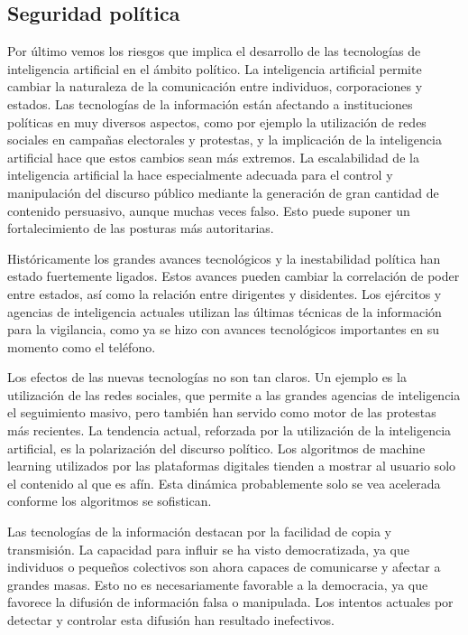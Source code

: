 \documentclass[12pt,a4paper]{article}
\begin{document}
\subsection{Seguridad política}

Por último vemos los riesgos que implica el desarrollo de las tecnologías de inteligencia artificial en el ámbito político. La inteligencia artificial permite cambiar la naturaleza de la comunicación entre individuos, corporaciones y estados. Las tecnologías de la información están afectando a instituciones políticas en muy diversos aspectos, como por ejemplo la utilización de redes sociales en campañas electorales y protestas, y la implicación de la inteligencia artificial hace que estos cambios sean más extremos. La escalabilidad de la inteligencia artificial la hace especialmente adecuada para el control y manipulación del discurso público mediante la generación de gran cantidad de contenido persuasivo, aunque muchas veces falso. Esto puede suponer un fortalecimiento de las posturas más autoritarias.

Históricamente los grandes avances tecnológicos y la inestabilidad política han estado fuertemente ligados. Estos avances pueden cambiar la correlación de poder entre estados, así como la relación entre dirigentes y disidentes. Los ejércitos y agencias de inteligencia actuales utilizan las últimas técnicas de la información para la vigilancia, como ya se hizo con avances tecnológicos importantes en su momento como el teléfono.

Los efectos de las nuevas tecnologías no son tan claros. Un ejemplo es la utilización de las redes sociales, que permite a las grandes agencias de inteligencia el seguimiento masivo, pero también han servido como motor de las protestas más recientes. La tendencia actual, reforzada por la utilización de la inteligencia artificial, es la polarización del discurso político. Los algoritmos de machine learning utilizados por las plataformas digitales tienden a mostrar al usuario solo el contenido al que es afín. Esta dinámica probablemente solo se vea acelerada conforme los algoritmos se sofistican.

Las tecnologías de la información destacan por la facilidad de copia y transmisión. La capacidad para influir se ha visto democratizada, ya que individuos o pequeños colectivos son ahora capaces de comunicarse y afectar a grandes masas. Esto no es necesariamente favorable a la democracia, ya que favorece la difusión de información falsa o manipulada. Los intentos actuales por detectar y controlar esta difusión han resultado inefectivos.
\end{document}
